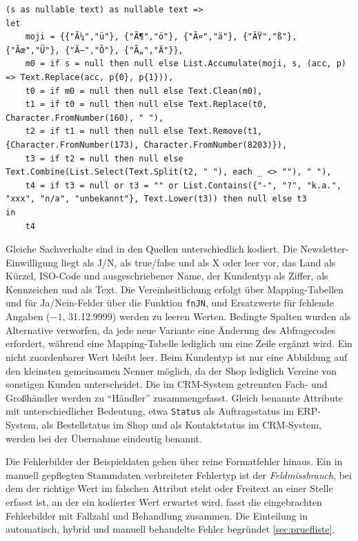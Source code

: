 \documentclass[a4paper,12pt]{article}
\newcommand{\pq}[1]{\texttt{#1}}        %
\begin{document}
\begin{lstlisting}[language=PowerQueryM, caption={Hilfsfunktion \pq{fnClean} gegen Zeichensatzfehler, unsichtbare Zeichen, Mehrfach-Leerzeichen und Platzhalter}, label={lst:fnclean}]
(s as nullable text) as nullable text =>
let
    moji = {{"Ã¼","ü"}, {"Ã¶","ö"}, {"Ã¤","ä"}, {"ÃŸ","ß"}, {"Ãœ","Ü"}, {"Ã–","Ö"}, {"Ã„","Ä"}},
    m0 = if s = null then null else List.Accumulate(moji, s, (acc, p) => Text.Replace(acc, p{0}, p{1})),
    t0 = if m0 = null then null else Text.Clean(m0),
    t1 = if t0 = null then null else Text.Replace(t0, Character.FromNumber(160), " "),
    t2 = if t1 = null then null else Text.Remove(t1, {Character.FromNumber(173), Character.FromNumber(8203)}),
    t3 = if t2 = null then null else Text.Combine(List.Select(Text.Split(t2, " "), each _ <> ""), " "),
    t4 = if t3 = null or t3 = "" or List.Contains({"-", "?", "k.a.", "xxx", "n/a", "unbekannt"}, Text.Lower(t3)) then null else t3
in
    t4
\end{lstlisting}

Gleiche Sachverhalte sind in den Quellen unterschiedlich kodiert. Die Newsletter-Einwilligung liegt als J/N, als true/false und als X oder leer vor, das Land als Kürzel, ISO-Code und ausgeschriebener Name, der Kundentyp als Ziffer, als Kennzeichen und als Text. Die Vereinheitlichung erfolgt über Mapping-Tabellen und für Ja/Nein-Felder über die Funktion \pq{fnJN}, und Ersatzwerte für fehlende Angaben ($-1$, 31.12.9999) werden zu leeren Werten. Bedingte Spalten wurden als Alternative verworfen, da jede neue Variante eine Änderung des Abfragecodes erfordert, während eine Mapping-Tabelle lediglich um eine Zeile ergänzt wird. Ein nicht zuordenbarer Wert bleibt leer. Beim Kundentyp ist nur eine Abbildung auf den kleinsten gemeinsamen Nenner möglich, da der Shop lediglich Vereine von sonstigen Kunden unterscheidet. Die im CRM-System getrennten Fach- und Großhändler werden zu \enquote{Händler} zusammengefasst. Gleich benannte Attribute mit unterschiedlicher Bedeutung, etwa \pq{Status} als Auftragsstatus im ERP-System, als Bestellstatus im Shop und als Kontaktstatus im CRM-System, werden bei der Übernahme eindeutig benannt.

Die Fehlerbilder der Beispieldaten gehen über reine Formatfehler hinaus. Ein in manuell gepflegten Stammdaten verbreiteter Fehlertyp ist der \emph{Feldmissbrauch}, bei dem der richtige Wert im falschen Attribut steht oder Freitext an einer Stelle erfasst ist, an der ein kodierter Wert erwartet wird.  fasst die eingebrachten Fehlerbilder mit Fallzahl und Behandlung zusammen. Die Einteilung in automatisch, hybrid und manuell behandelte Fehler begründet \cref{sec:pruefliste}.
\end{document}
